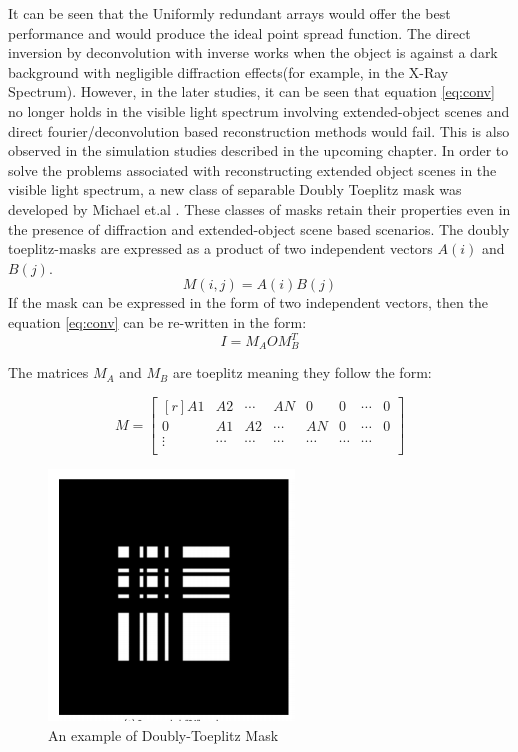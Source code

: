 It can be seen that the Uniformly redundant arrays would offer the best performance and would produce the ideal point spread function. The direct inversion by deconvolution with inverse works when the object is against a dark background with negligible diffraction effects(for example, in the X-Ray Spectrum). 
However, in the later studies\cite{Toeplitz}, it can be seen that equation \ref{eq:conv} no longer holds in the visible light spectrum involving extended-object scenes and direct fourier/deconvolution based reconstruction methods would fail. This is also observed in the simulation studies described in the upcoming chapter. In order to solve the problems associated with reconstructing extended object scenes in the visible light spectrum, a new class of separable Doubly Toeplitz mask was developed by Michael et.al \cite{Toeplitz}. These classes of masks retain their properties even in the presence of diffraction and extended-object scene based scenarios. The doubly toeplitz-masks are expressed as a product of two independent vectors $A(i)$ and $B(j)$.
\begin{equation}
M(i,j) = A(i)B(j)
\end{equation}
If the mask can be expressed in the form of two independent vectors, then the equation \ref{eq:conv} can be re-written in the form: 
\begin{equation}
I = M_AOM_B^T
\label{eq:separable}
\end{equation}

The matrices $M_A$ and $M_B$ are toeplitz meaning they follow the form:

\[ %
 M = 
 \begin{bmatrix*}[r]
    A1 & A2 & \cdots &AN & 0 &0 & \cdots & 0 \\
    0 & A1 & A2 & \cdots &AN & 0 & \cdots & 0\\
    \vdots &\cdots &\cdots &\cdots &\cdots&\cdots&\cdots \\
  \end{bmatrix*}
\]

\begin{figure}[ht]
\centering
\includegraphics[scale = 0.50]{pics/doubly-topelitz}
\caption{An example of Doubly-Toeplitz Mask\cite{Toeplitz}}
\label{fig:doubly_toeplitz}
\end{figure}


